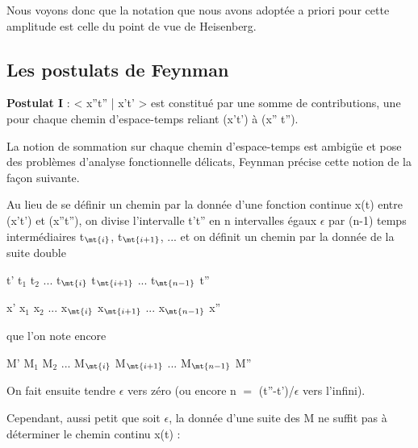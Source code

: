 Nous voyons donc que la notation que nous avons adoptée a
priori pour cette amplitude est celle du point de vue de Heisenberg.

 
\subsection{Les postulats de Feynman}

{\bf Postulat I} : < x''t'' | x't' > est constitué par une somme de contributions,
une pour chaque chemin d'espace-temps reliant (x't') à (x'' t'').

La notion de sommation sur chaque chemin d'espace-temps est
ambigüe et pose des problèmes d'analyse fonctionnelle délicats,
Feynman précise cette notion de la façon suivante.

Au lieu de se définir un chemin par la donnée d'une fonction
continue x(t) entre (x't') et (x''t''), on divise l'intervalle t't'' en
n intervalles égaux $\epsilon$ par (n-1) temps intermédiaires t$_\mt{i}$,
t$_\mt{i+1}$, ... et
on définit un chemin par la donnée de la suite double

\begin{center}
t' t$_1$ t$_2$ ... t$_\mt{i}$ t$_\mt{i+1}$ ... t$_\mt{n-1}$ t''

x' x$_1$ x$_2$ ... x$_\mt{i}$ x$_\mt{i+1}$ ... x$_\mt{n-1}$ x''
\end{center}

que l'on note encore
\begin{center}
M' M$_1$ M$_2$ ... M$_\mt{i}$ M$_\mt{i+1}$ ... M$_\mt{n-1}$ M''
\end{center}

On fait ensuite tendre $\epsilon$ vers zéro (ou encore n $=$ (t''-t')/$\epsilon$
vers l'infini).

Cependant, aussi petit que soit $\epsilon$, la donnée d'une suite des M
ne suffit pas à déterminer le chemin continu x(t) :

